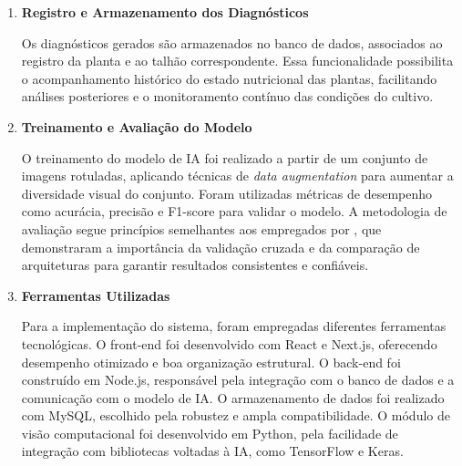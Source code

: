 \begin{enumerate}
\item \textbf{Registro e Armazenamento dos Diagnósticos}

Os diagnósticos gerados são armazenados no banco de dados, associados ao registro da planta e ao talhão correspondente. Essa funcionalidade possibilita o acompanhamento histórico do estado nutricional das plantas, facilitando análises posteriores e o monitoramento contínuo das condições do cultivo.

\item \textbf{Treinamento e Avaliação do Modelo}

O treinamento do modelo de IA foi realizado a partir de um conjunto de imagens rotuladas, aplicando técnicas de \textit{data augmentation} para aumentar a diversidade visual do conjunto. Foram utilizadas métricas de desempenho como acurácia, precisão e F1-score para validar o modelo. A metodologia de avaliação segue princípios semelhantes aos empregados por \textcite{Tran2019}, que demonstraram a importância da validação cruzada e da comparação de arquiteturas para garantir resultados consistentes e confiáveis.

\item \textbf{Ferramentas Utilizadas}

Para a implementação do sistema, foram empregadas diferentes ferramentas tecnológicas. O front-end foi desenvolvido com React e Next.js, oferecendo desempenho otimizado e boa organização estrutural. O back-end foi construído em Node.js, responsável pela integração com o banco de dados e a comunicação com o modelo de IA. O armazenamento de dados foi realizado com MySQL, escolhido pela robustez e ampla compatibilidade. O módulo de visão computacional foi desenvolvido em Python, pela facilidade de integração com bibliotecas voltadas à IA, como TensorFlow e Keras.
\end{enumerate}
